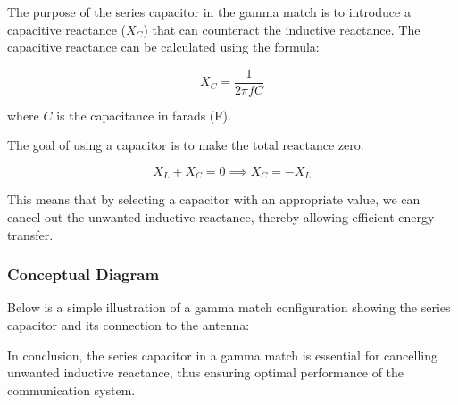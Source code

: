 The purpose of the series capacitor in the gamma match is to introduce a capacitive reactance ($X_C$) that can counteract the inductive reactance. The capacitive reactance can be calculated using the formula:

\[
X_C = \frac{1}{2 \pi f C}
\]

where \(C\) is the capacitance in farads (F).

The goal of using a capacitor is to make the total reactance zero:

\[
X_L + X_C = 0 \implies X_C = -X_L
\]

This means that by selecting a capacitor with an appropriate value, we can cancel out the unwanted inductive reactance, thereby allowing efficient energy transfer.

\subsubsection{Conceptual Diagram}

Below is a simple illustration of a gamma match configuration showing the series capacitor and its connection to the antenna:

\begin{center}
\end{center}

In conclusion, the series capacitor in a gamma match is essential for cancelling unwanted inductive reactance, thus ensuring optimal performance of the communication system.
